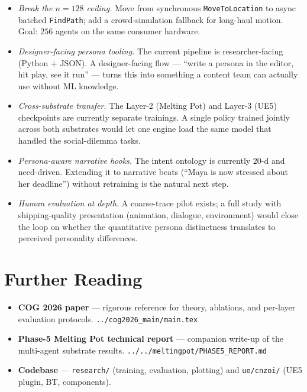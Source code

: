 \documentclass[11pt]{article}
\begin{document}
\begin{itemize}[leftmargin=*,nosep]
\item \emph{Break the $n\!=\!128$ ceiling.} Move from synchronous
\texttt{MoveToLocation} to async batched \texttt{FindPath}; add a
crowd-simulation fallback for long-haul motion. Goal: $256$ agents on
the same consumer hardware.
\item \emph{Designer-facing persona tooling.} The current pipeline
is researcher-facing (Python + JSON). A designer-facing flow ---
``write a persona in the editor, hit play, see it run'' ---
turns this into something a content team can actually use without
ML knowledge.
\item \emph{Cross-substrate transfer.} The Layer-2 (Melting Pot) and
Layer-3 (UE5) checkpoints are currently separate trainings. A
single policy trained jointly across both substrates would let one
engine load the same model that handled the social-dilemma tasks.
\item \emph{Persona-aware narrative hooks.} The intent ontology is
currently $20$-d and need-driven. Extending it to narrative beats
(``Maya is now stressed about her deadline'') without retraining
is the natural next step.
\item \emph{Human evaluation at depth.} A coarse-trace pilot exists;
a full study with shipping-quality presentation (animation,
dialogue, environment) would close the loop on whether the
quantitative persona distinctness translates to perceived
personality differences.
\end{itemize}

\section*{Further Reading}

\begin{itemize}[leftmargin=*,nosep]
\item \textbf{COG 2026 paper} --- rigorous reference for theory,
ablations, and per-layer evaluation protocols.
\texttt{../cog2026\_main/main.tex}
\item \textbf{Phase-5 Melting Pot technical report} --- companion
write-up of the multi-agent substrate results.
\texttt{../../meltingpot/PHASE5\_REPORT.md}
\item \textbf{Codebase} --- \texttt{research/} (training, evaluation,
plotting) and \texttt{ue/cnzoi/} (UE5 plugin, BT, components).
\end{itemize}
\end{document}
